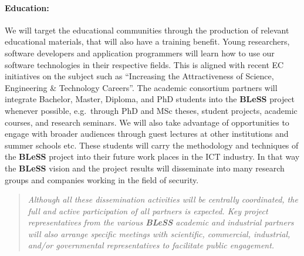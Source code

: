 \documentclass[a4paper,11pt]{article}
\newcommand{\project}[1]{\textbf{#1}\xspace}
\newcommand{\BLESS}{\project{BLeSS}}
\newcommand{\TheProject}{\BLESS}
\begin{document}
\paragraph{Education:} We will target 
the educational communities through the production of relevant educational materials, that will
also have a training benefit. Young researchers, software
 developers and application programmers will learn how to
 use our software technologies in their
 respective fields. This is aligned with recent EC
 initiatives on the subject such as ``Increasing the Attractiveness
 of Science, Engineering \& Technology Careers''.
 The academic consortium partners will integrate Bachelor,
 Master, Diploma, and PhD students into the \TheProject{}
 project whenever possible, e.g.~through PhD and MSc theses, student
 projects, academic courses, and research seminars. 
 We will also take advantage of opportunities to engage with broader
 audiences through guest lectures at other institutions and summer schools etc.
 These students will
 carry the methodology and techniques of the \TheProject{}
 project into their future work places in the ICT industry.
 In that way the \TheProject{} vision and the project
 results will disseminate into many research groups and
 companies working in the field of security.


\begin{quote}

\emph{Although all these dissemination activities
will be centrally coordinated, the full and active participation of
all partners is expected. Key project representatives from
the various \TheProject{} academic and industrial
partners will also arrange specific meetings
with scientific, commercial, industrial, and/or
governmental representatives to facilitate public
engagement.}
\end{quote}
\end{document}
